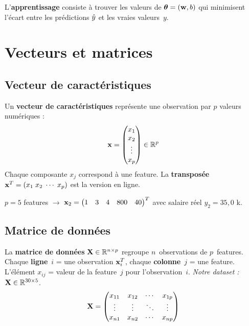 \begin{retenirbox}[Apprendre = ajuster les param\`{e}tres]
    L'\textbf{apprentissage} consiste \`{a} trouver les valeurs de $\boldsymbol{\theta} = (\mathbf{w}, b)$
    qui minimisent l'\'{e}cart entre les pr\'{e}dictions $\hat{y}$ et les vraies valeurs~$y$.
\end{retenirbox}

\section{Vecteurs et matrices}

\subsection{Vecteur de caract\'{e}ristiques}

\begin{definitionbox}
    Un \textbf{vecteur de caract\'{e}ristiques} repr\'{e}sente une observation par
    $p$ valeurs num\'{e}riques :
    \[
        \mathbf{x} = \begin{pmatrix} x_1 \\ x_2 \\ \vdots \\ x_p \end{pmatrix} \in \mathbb{R}^p
    \]
    Chaque composante $x_j$ correspond \`{a} une feature.
    La \textbf{transpos\'{e}e} $\mathbf{x}^T = (x_1 \; x_2 \; \cdots \; x_p)$ est la version en ligne.
\end{definitionbox}

\begin{exemplebox}
    $p = 5$ features $\to$
    $\mathbf{x}_2 = \begin{pmatrix} 1 & 3 & 4 & 800 & 40 \end{pmatrix}^T$
    avec salaire r\'{e}el $y_2 = 35{,}0$ k\texteuro.
\end{exemplebox}

\subsection{Matrice de donn\'{e}es}

\begin{definitionbox}
    La \textbf{matrice de donn\'{e}es} $\mathbf{X} \in \mathbb{R}^{n \times p}$ regroupe
    $n$~observations de $p$~features.
    Chaque \textbf{ligne}~$i$ = une observation $\mathbf{x}_i^T$,
    chaque \textbf{colonne}~$j$ = une feature.
    L'\'{e}l\'{e}ment $x_{ij}$ = valeur de la feature~$j$ pour l'observation~$i$.
    \emph{Notre dataset :} $\mathbf{X} \in \mathbb{R}^{30 \times 5}$.
    \[
        \mathbf{X} = \begin{pmatrix}
            x_{11} & x_{12} & \cdots & x_{1p} \\
            \vdots & \vdots & \ddots & \vdots \\
            x_{n1} & x_{n2} & \cdots & x_{np}
        \end{pmatrix}
    \]
\end{definitionbox}

